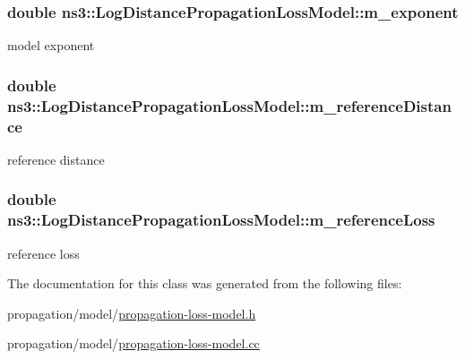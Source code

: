 \subsubsection[{\texorpdfstring{m\+\_\+exponent}{m_exponent}}]{\setlength{\rightskip}{0pt plus 5cm}double ns3\+::\+Log\+Distance\+Propagation\+Loss\+Model\+::m\+\_\+exponent\hspace{0.3cm}{\ttfamily [private]}}\hypertarget{classns3_1_1LogDistancePropagationLossModel_a70538e0d462564ad358ead5ab67aa3db}{}\label{classns3_1_1LogDistancePropagationLossModel_a70538e0d462564ad358ead5ab67aa3db}


model exponent 

\subsubsection[{\texorpdfstring{m\+\_\+reference\+Distance}{m_referenceDistance}}]{\setlength{\rightskip}{0pt plus 5cm}double ns3\+::\+Log\+Distance\+Propagation\+Loss\+Model\+::m\+\_\+reference\+Distance\hspace{0.3cm}{\ttfamily [private]}}\hypertarget{classns3_1_1LogDistancePropagationLossModel_a1e40651f77e1aa2226eac1668b5bc22c}{}\label{classns3_1_1LogDistancePropagationLossModel_a1e40651f77e1aa2226eac1668b5bc22c}


reference distance 

\subsubsection[{\texorpdfstring{m\+\_\+reference\+Loss}{m_referenceLoss}}]{\setlength{\rightskip}{0pt plus 5cm}double ns3\+::\+Log\+Distance\+Propagation\+Loss\+Model\+::m\+\_\+reference\+Loss\hspace{0.3cm}{\ttfamily [private]}}\hypertarget{classns3_1_1LogDistancePropagationLossModel_ad5065bb57e5dc5863189ab6e014080a0}{}\label{classns3_1_1LogDistancePropagationLossModel_ad5065bb57e5dc5863189ab6e014080a0}


reference loss 



The documentation for this class was generated from the following files\+:\begin{DoxyCompactItemize}
\item 
propagation/model/\hyperlink{propagation-loss-model_8h}{propagation-\/loss-\/model.\+h}\item 
propagation/model/\hyperlink{propagation-loss-model_8cc}{propagation-\/loss-\/model.\+cc}\end{DoxyCompactItemize}
